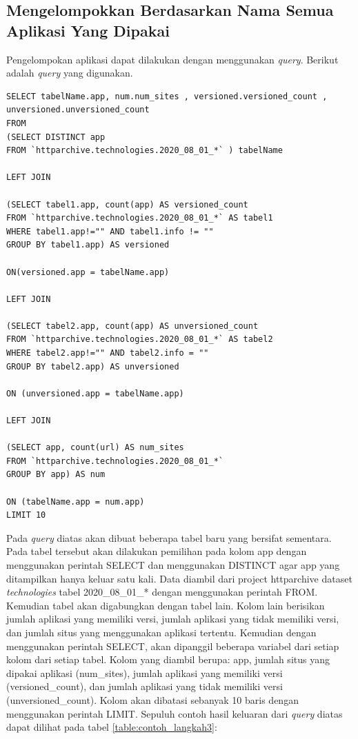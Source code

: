 \subsection{Mengelompokkan Berdasarkan Nama Semua Aplikasi Yang Dipakai}
Pengelompokan aplikasi dapat dilakukan dengan menggunakan \textit{query}. Berikut adalah \textit{query} yang digunakan.
\begin{lstlisting}
SELECT tabelName.app, num.num_sites , versioned.versioned_count , unversioned.unversioned_count
FROM 
(SELECT DISTINCT app
FROM `httparchive.technologies.2020_08_01_*` ) tabelName

LEFT JOIN 

(SELECT tabel1.app, count(app) AS versioned_count
FROM `httparchive.technologies.2020_08_01_*` AS tabel1
WHERE tabel1.app!="" AND tabel1.info != "" 
GROUP BY tabel1.app) AS versioned

ON(versioned.app = tabelName.app)

LEFT JOIN

(SELECT tabel2.app, count(app) AS unversioned_count
FROM `httparchive.technologies.2020_08_01_*` AS tabel2
WHERE tabel2.app!="" AND tabel2.info = "" 
GROUP BY tabel2.app) AS unversioned

ON (unversioned.app = tabelName.app)

LEFT JOIN 

(SELECT app, count(url) AS num_sites
FROM `httparchive.technologies.2020_08_01_*`
GROUP BY app) AS num

ON (tabelName.app = num.app)
LIMIT 10
\end{lstlisting}

Pada \textit{query} diatas akan dibuat beberapa tabel baru yang bersifat sementara. Pada tabel tersebut akan dilakukan pemilihan pada kolom app dengan menggunakan perintah SELECT dan menggunakan DISTINCT agar app yang ditampilkan hanya keluar satu kali. Data diambil dari project httparchive dataset \textit{technologies} tabel 2020\_08\_01\_* dengan menggunakan perintah FROM. Kemudian tabel akan digabungkan dengan tabel lain. Kolom lain berisikan jumlah aplikasi yang memiliki versi, jumlah aplikasi yang tidak memiliki versi, dan jumlah situs yang menggunakan aplikasi tertentu. Kemudian dengan menggunakan perintah SELECT, akan dipanggil beberapa variabel dari setiap kolom dari setiap tabel. Kolom yang diambil berupa: app, jumlah situs yang dipakai aplikasi (num\_sites), jumlah aplikasi yang memiliki versi (versioned\_count), dan jumlah aplikasi yang tidak memiliki versi (unversioned\_count). Kolom akan dibatasi sebanyak 10 baris dengan menggunakan perintah LIMIT. Sepuluh contoh hasil keluaran dari \textit{query} diatas dapat dilihat pada tabel \ref{table:contoh_langkah3}:

